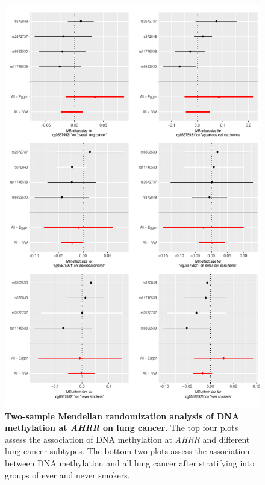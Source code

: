 \documentclass[11pt,oneside]{bristolthesis}
\begin{document}
\begin{figure}

{\centering \includegraphics[width=1\linewidth]{figure/07-dnam_lungcancer_mr/sup_fig5-ahrr_2samp} 

}

\caption[Two-sample Mendelian randomization analysis of DNA methylation at \emph{AHRR} on lung cancer]{\textbf{Two-sample Mendelian randomization analysis of DNA methylation at \emph{AHRR} on lung cancer}. The top four plots assess the association of DNA methylation at \emph{AHRR} and different lung cancer subtypes. The bottom two plots assess the association between DNA methylation and all lung cancer after stratifying into groups of ever and never smokers.}\label{fig:sup-fig5-07}
\end{figure}
\end{document}
